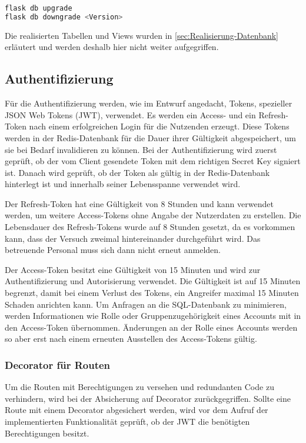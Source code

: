 \begin{lstlisting}[language=bash, frame=single, caption={GIS Nutzung eines Migrationsskripts}, captionpos=b, label={lst:gis-use-migration}]
flask db upgrade
flask db downgrade <Version>
\end{lstlisting}

Die realisierten Tabellen und Views wurden in \autoref{sec:Realisierung-Datenbank} erläutert und werden deshalb hier nicht weiter aufgegriffen.

\subsection{Authentifizierung}\label{sub:realisierung-authentifizierung}

Für die Authentifizierung werden, wie im Entwurf angedacht, Tokens, spezieller JSON Web Tokens (JWT), verwendet. Es werden ein Access- und ein Refresh-Token nach einem erfolgreichen Login für die Nutzenden erzeugt. Diese Tokens werden in der Redis-Datenbank für die Dauer ihrer Gültigkeit abgespeichert, um sie bei Bedarf invalidieren zu können. Bei der Authentifizierung wird zuerst geprüft, ob der vom Client gesendete Token mit dem richtigen Secret Key signiert ist. Danach wird geprüft, ob der Token als gültig in der Redis-Datenbank hinterlegt ist und innerhalb seiner Lebensspanne verwendet wird.

Der Refresh-Token hat eine Gültigkeit von 8 Stunden und kann verwendet werden, um weitere Access-Tokens ohne Angabe der Nutzerdaten zu erstellen. Die Lebensdauer des Refresh-Tokens wurde auf 8 Stunden gesetzt, da es vorkommen kann, dass der Versuch zweimal hintereinander durchgeführt wird. Das betreuende Personal muss sich dann nicht erneut anmelden.

Der Access-Token besitzt eine Gültigkeit von 15 Minuten und wird zur Authentifizierung und Autorisierung verwendet. Die Gültigkeit ist auf 15 Minuten begrenzt, damit bei einem Verlust des Tokens, ein Angreifer maximal 15 Minuten Schaden anrichten kann. Um Anfragen an die SQL-Datenbank zu minimieren, werden Informationen wie Rolle oder Gruppenzugehörigkeit eines Accounts mit in den Access-Token übernommen. Änderungen an der Rolle eines Accounts werden so aber erst nach einem erneuten Ausstellen des Access-Tokens gültig.

\subsubsection{Decorator für Routen}
Um die Routen mit Berechtigungen zu versehen und redundanten Code zu verhindern, wird bei der Absicherung auf Decorator zurückgegriffen. Sollte eine Route mit einem Decorator abgesichert werden, wird vor dem Aufruf der implementierten Funktionalität geprüft, ob der JWT die benötigten Berechtigungen besitzt.

